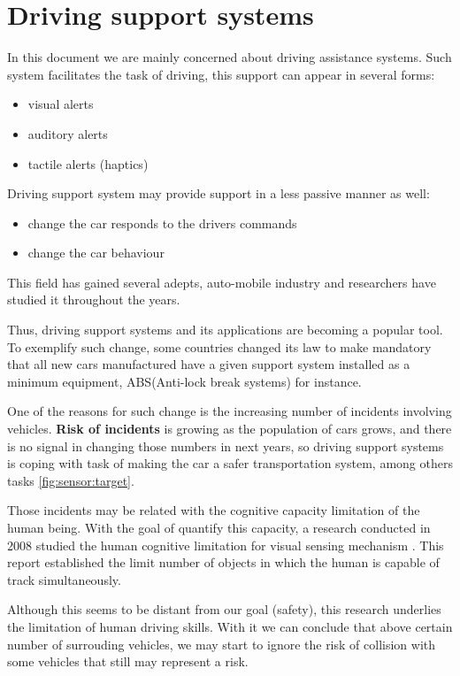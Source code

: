 \section{Driving support systems}

In this document we are mainly concerned about driving assistance systems. Such system facilitates the task of driving, this support can appear in several forms: 

\begin{itemize}
\item visual alerts
\item auditory alerts
\item tactile alerts (haptics\cite{riener2010sensor})
\end{itemize}

Driving support system may provide support in a less passive manner as well:

\begin{itemize}
\item change the car responds to the drivers commands
\item change the car behaviour
\end{itemize}

This field has gained several adepts, auto-mobile industry and researchers have studied it throughout the years.

Thus, driving support systems and its applications are becoming a popular tool. To exemplify such change, some countries changed its law to make mandatory that all new cars manufactured have a given support system installed as a minimum equipment, ABS(Anti-lock break systems)  for instance.

One of the reasons for such change is the increasing number of incidents involving vehicles. \textbf{Risk of incidents} is growing as the population of cars grows, and there is no signal in changing those numbers in next years, so driving support systems is coping with task of making the car a safer transportation system, among others tasks \ref{fig:sensor:target}.

Those incidents may be related with the cognitive capacity limitation of the human being. With the goal of quantify this capacity, a research conducted in 2008 studied the human cognitive limitation for visual sensing mechanism \cite{LautarutisV}. This report established the limit number of objects in which the human is capable of track simultaneously. 

Although this seems to be distant from our goal (safety), this research underlies the limitation of human driving skills. With it we can conclude that above certain number of surrouding vehicles, we may start to ignore the risk of collision with some vehicles that still may represent a risk.

